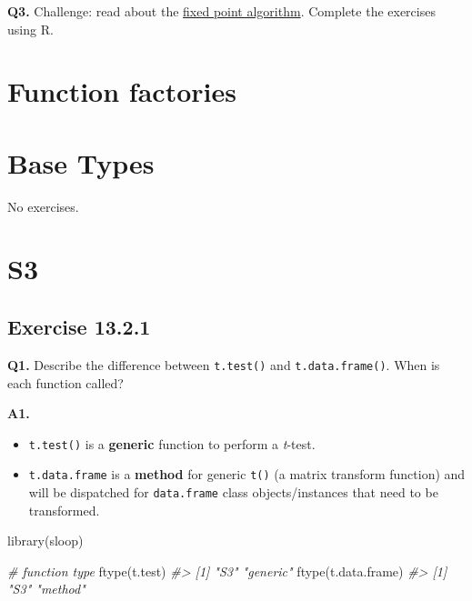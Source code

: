 \documentclass[
]{book}
\newenvironment{Shaded}{\begin{snugshade}}{\end{snugshade}}
\newcommand{\CommentTok}[1]{\textcolor[rgb]{0.56,0.35,0.01}{\textit{#1}}}
\newcommand{\FunctionTok}[1]{\textcolor[rgb]{0.00,0.00,0.00}{#1}}
\newcommand{\NormalTok}[1]{#1}
\begin{document}
\textbf{Q3.} Challenge: read about the \href{https://mitpress.mit.edu/sites/default/files/sicp/full-text/book/book-Z-H-12.html\#\%25_idx_1096}{fixed point algorithm}. Complete the exercises using R.

\hypertarget{function-factories}{%
\chapter{Function factories}\label{function-factories}}

\hypertarget{base-types}{%
\chapter{Base Types}\label{base-types}}

No exercises.

\hypertarget{s3}{%
\chapter{S3}\label{s3}}

\hypertarget{exercise-13.2.1}{%
\section{Exercise 13.2.1}\label{exercise-13.2.1}}

\textbf{Q1.} Describe the difference between \texttt{t.test()} and \texttt{t.data.frame()}. When is each function called?

\textbf{A1.}

\begin{itemize}
\item
  \texttt{t.test()} is a \textbf{generic} function to perform a \emph{t}-test.
\item
  \texttt{t.data.frame} is a \textbf{method} for generic \texttt{t()} (a matrix transform function) and will be dispatched for \texttt{data.frame} class objects/instances that need to be transformed.
\end{itemize}

\begin{Shaded}
\begin{Highlighting}[]
\FunctionTok{library}\NormalTok{(sloop)}

\CommentTok{\# function type}
\FunctionTok{ftype}\NormalTok{(t.test)}
\CommentTok{\#\textgreater{} [1] "S3"      "generic"}
\FunctionTok{ftype}\NormalTok{(t.data.frame)}
\CommentTok{\#\textgreater{} [1] "S3"     "method"}
\end{Highlighting}
\end{Shaded}
\end{document}
